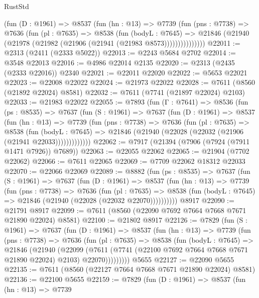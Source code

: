 \begin{lexlean}{RustStd}
\begin{coremodule}
            (fun (D : @1961) =>
            @8537
              (fun (hn : @13) =>
              @7739
                (fun (pns : @7738) =>
                @7636
                  (fun (pl : @7635) =>
                  @8538
                    (fun (bodyL : @7645) =>
                    @21846 (@21940 (@21978 (@21982 (@21906 (@21941 (@21983 @8573)))))))))))))))
@22011 := @2313 (@2411 (@2333 @5022))
@22013 := @2243 @5684 @2702
@22014 := @3548 @22013
@22016 := @4986 @22014 @2135
@22020 := @2313 (@2435 (@2333 @22016)) @2340
@22021 := @22011 @22020
@22022 := @5653 @22021
@22023 := @22008 @22022
@22024 := @21973 @22022
@22028 := @7611 (@8560 (@21892 @22024) @8581)
@22032 := @7611 (@7741 (@21897 @22024) @2103)
@22033 := @21983 @22022
@22055 := @7893
    (fun (Γ : @7641) =>
    @8536
      (fun (ps : @8535) =>
      @7637
        (fun (S : @1961) =>
        @7637
          (fun (D : @1961) =>
          @8537
            (fun (hn : @13) =>
            @7739
              (fun (pns : @7738) =>
              @7636
                (fun (pl : @7635) =>
                @8538
                  (fun (bodyL : @7645) =>
                  @21846 (@21940 (@22028 (@22032 (@21906 (@21941 @22033)))))))))))))
@22062 := @7917 (@21394 (@7906 (@7924 (@7911 @1471 @7926)) @7689))
@22063 := @22055 @22062
@22065 := @21904 (@7702 @22062)
@22066 := @7611 @22065
@22069 := @7709 @22062 @18312 @22033
@22070 := @22066 @22069
@22089 := @8882
    (fun (ps : @8535) =>
    @7637
      (fun (S : @1961) =>
      @7637
        (fun (D : @1961) =>
        @8537
          (fun (hn : @13) =>
          @7739
            (fun (pns : @7738) =>
            @7636
              (fun (pl : @7635) =>
              @8538 (fun (bodyL : @7645) => @21846 (@21940 (@22028 (@22032 @22070))))))))))
    @8917
@22090 := @21791 @8917
@22099 := @7611 (@8560 (@22090 @7692 @7664 @7668 @7671 @21890 @22024) @8581)
@22100 := @21802 @8917
@22126 := @7829
    (fun (S : @1961) =>
    @7637
      (fun (D : @1961) =>
      @8537
        (fun (hn : @13) =>
        @7739
          (fun (pns : @7738) =>
          @7636
            (fun (pl : @7635) =>
            @8538
              (fun (bodyL : @7645) =>
              @21846
                (@21940
                  (@22099
                    (@7611
                      (@7741 (@22100 @7692 @7664 @7668 @7671 @21890 @22024) @2103)
                      @22070)))))))))
    @5655
@22127 := @22090 @5655
@22135 := @7611 (@8560 (@22127 @7664 @7668 @7671 @21890 @22024) @8581)
@22136 := @22100 @5655
@22159 := @7829
    (fun (D : @1961) =>
    @8537
      (fun (hn : @13) =>
      @7739

\end{coremodule}
\end{lexlean}
